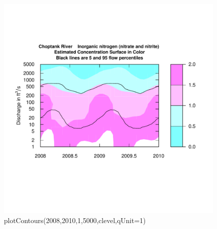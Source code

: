 \documentclass[a4paper,11pt]{article}\usepackage{graphicx, color}
\newenvironment{knitrout}{}{} %
\begin{document}
\begin{knitrout}
\color{fgcolor}\begin{figure}[]

\includegraphics[width=1\linewidth,height=1\linewidth]{figure/plotContours} \caption[plotContours(2008,2010,1,5000,clevel,qUnit=1)]{plotContours(2008,2010,1,5000,clevel,qUnit=1)\label{fig:plotContours}}
\end{figure}


\end{knitrout}
\end{document}
